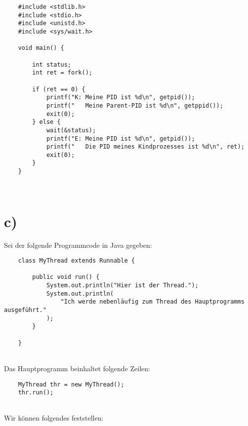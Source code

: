 \begin{verbatim}
    #include <stdlib.h>
    #include <stdio.h>
    #include <unistd.h>
    #include <sys/wait.h>

    void main() {

        int status;
        int ret = fork();

        if (ret == 0) {
            printf("K: Meine PID ist %d\n", getpid());
            printf("   Meine Parent-PID ist %d\n", getppid());
            exit(0);
        } else {
            wait(&status);
            printf("E: Meine PID ist %d\n", getpid());
            printf("   Die PID meines Kindprozesses ist %d\n", ret);
            exit(0);
        }
    }
\end{verbatim}\\


\section{c)}
Sei der folgende Programmcode in Java gegeben:

\begin{verbatim}
    class MyThread extends Runnable {

        public void run() {
            System.out.println("Hier ist der Thread.");
            System.out.println(
                "Ich werde nebenläufig zum Thread des Hauptprogramms ausgeführt."
            );
        }

    }
\end{verbatim}\\

\noindent
Das Hauptprogramm beinhaltet folgende Zeilen:

\begin{verbatim}
    MyThread thr = new MyThread();
    thr.run();
\end{verbatim}\\

\noindent
Wir können folgendes feststellen:

